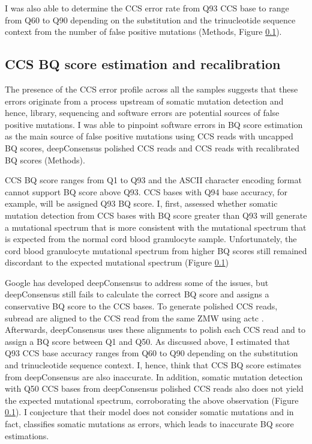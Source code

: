 
I was also able to determine the CCS error rate from Q93 CCS base to range from Q60 to Q90 depending on the substitution and the trinucleotide sequence context from the number of false positive mutations (Methods, Figure \ref{}).



\subsection{CCS BQ score estimation and recalibration} 

The presence of the CCS error profile across all the samples suggests that these errors originate from a process upstream of somatic mutation detection and hence, library, sequencing and software errors are potential sources of false positive mutations. I was able to pinpoint software errors in BQ score estimation as the main source of false positive mutations using CCS reads with uncapped BQ scores, deepConsensus polished CCS reads and CCS reads with recalibrated BQ scores (Methods). 

CCS BQ score ranges from Q1 to Q93 and the ASCII character encoding format cannot support BQ score above Q93. CCS bases with Q94 base accuracy, for example, will be assigned Q93 BQ score. I, first, assessed whether somatic mutation detection from CCS bases with BQ score greater than Q93 will generate a mutational spectrum that is more consistent with the mutational spectrum that is expected from the normal cord blood granulocyte sample. Unfortunately, the cord blood granulocyte mutational spectrum from higher BQ scores still remained discordant to the expected mutational spectrum (Figure \ref{})


Google has developed deepConsensus to address some of the issues, but deepConsensus still fails to calculate the correct BQ score and assigns a conservative BQ score to the CCS bases. To generate polished CCS reads, subread are aligned to the CCS read from the same ZMW using actc \cite{}. Afterwards, deepConsensus uses these alignments to polish each CCS read and to assign a BQ score between Q1 and Q50. As discussed above, I estimated that Q93 CCS base accuracy ranges from Q60 to Q90 depending on the substitution and trinucleotide sequence context. I, hence, think that CCS BQ score estimates from deepConsensus are also inaccurate. In addition, somatic mutation detection with Q50 CCS bases from deepConsensus polished CCS reads also does not yield the expected mutational spectrum, corroborating the above observation (Figure \ref{}). I conjecture that their model does not consider somatic mutations and in fact, classifies somatic mutations as errors, which leads to inaccurate BQ score estimations.  

